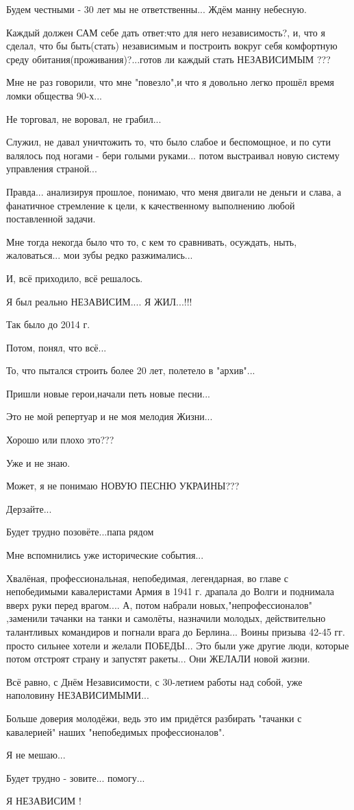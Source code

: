Будем честными - 30 лет мы не ответственны... Ждём манну небесную.

Каждый должен САМ себе дать ответ:что для него независимость?, и, что я
сделал, что бы быть(стать) независимым и построить вокруг себя комфортную среду
обитания(проживания)?...готов ли каждый стать НЕЗАВИСИМЫМ ???

Мне не раз говорили, что мне "повезло",и что я довольно легко прошёл время ломки общества 90-х...

Не торговал, не воровал, не грабил...

Служил, не давал уничтожить то, что было слабое и беспомощное, и по сути валялось
под ногами - бери голыми руками... потом выстраивал новую систему управления
страной...

Правда... анализируя прошлое, понимаю, что меня двигали не деньги и слава, а
фанатичное стремление к цели, к качественному выполнению любой поставленной
задачи.

Мне тогда некогда было что то, с кем то сравнивать, осуждать, ныть,
жаловаться... мои зубы редко разжимались...

И, всё приходило, всё решалось.

Я был реально НЕЗАВИСИМ.... Я ЖИЛ...!!!

Так было до 2014 г.

Потом, понял, что всё...

То, что пытался строить более 20 лет, полетело в "архив"...

Пришли новые герои,начали петь новые песни...

Это не мой репертуар и не моя мелодия Жизни...

Хорошо или плохо это???

Уже и не знаю.

Может, я не понимаю НОВУЮ ПЕСНЮ УКРАИНЫ???

Дерзайте...

Будет трудно позовёте...папа рядом 🙂

Мне вспомнились уже исторические события...

Хвалёная, профессиональная, непобедимая, легендарная, во главе с непобедимыми
кавалеристами Армия в 1941 г. драпала до Волги и поднимала вверх руки перед
врагом.... А, потом набрали новых,"непрофессионалов" ,заменили тачанки на танки
и самолёты, назначили молодых, действительно талантливых командиров и погнали
врага до Берлина...  Воины призыва 42-45 гг. просто сильнее хотели и желали
ПОБЕДЫ... Это были уже другие люди, которые потом отстроят страну и запустят
ракеты... Они ЖЕЛАЛИ новой жизни.

Всё равно, с Днём Независимости, с 30-летием работы над собой, уже наполовину
НЕЗАВИСИМЫМИ...

Больше доверия молодёжи, ведь это им придётся разбирать "тачанки с кавалерией"
наших "непобедимых профессионалов".

Я не мешаю...

Будет трудно - зовите... помогу...

Я НЕЗАВИСИМ !

